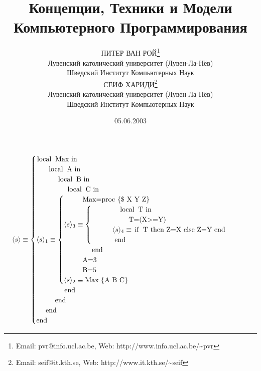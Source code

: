 \documentclass[a4paper, 12pt]{book}
\title{Концепции, Техники и Модели Компьютерного Программирования}
\date{05.06.2003}
\author{ПИТЕР ВАН РОЙ\thanks{Email: pvr@info.ucl.ac.be, Web: http://www.info.ucl.ac.be/\textasciitilde pvr}\\Лувенский католический университет (Лувен-Ла-Нёв)\\Шведский Институт Компьютерных Наук\\ СЕИФ ХАРИДИ\thanks{Email: seif@it.kth.se, Web: http://www.it.kth.se/\textasciitilde seif}\\Лувенский католический университет (Лувен-Ла-Нёв)\\Шведский Институт Компьютерных Наук}
\begin{document}

\lstset{language=Oz, mathescape=true, style=customoz}


\renewcommand {\contentsname} {Оглавление}
\renewcommand {\chaptername} {Глава}


{\let\newpage\relax\maketitle}
\maketitle
\tableofcontents





$$
\langle s \rangle \equiv \begin{cases}
  \text{\lstinline!local Max in!}\\
  \text{~~~~ \lstinline!local A in!}\\
  \text{~~~~~~~~ \lstinline!local B in!}\\
  \text{~~~~~~~~~~~~ \lstinline!local C in!}\\
  \langle s \rangle _1 \equiv \begin{cases}
    \text{~~~~~~~~\lstinline[mathescape=false]!Max=proc \{$ X Y Z\}!}\\
    \langle s \rangle _3 \equiv \begin{cases}
      \text{~~~~~~~~~~~~\lstinline!local T in!}\\
      \text{~~~~~~~~~~~~~~~~\lstinline!T=(X>=Y)!}\\
      \text{~~~~~~~~~} \langle s \rangle _4 \equiv \text{\lstinline!if T then Z=X else Z=Y end!}\\
      \text{~~~~~~~~~~\lstinline!end!}
    \end{cases}\\
    \text{~~~~~~~~~~~~\lstinline!end!}\\
    \text{~~~~~~~~\lstinline!A=3!}\\
    \text{~~~~~~~~\lstinline!B=5!}\\
    \langle s \rangle _2 \equiv \text{\lstinline!Max \{A B C\}!}\\
  \end{cases}\\
  \text{~~~~~~~~~~~~\lstinline!end!}\\
  \text{~~~~~~~~\lstinline!end!}\\
  \text{~~~~\lstinline!end!}\\
  \text{\lstinline!end!}
  \end{cases}
$$
\end{document}
